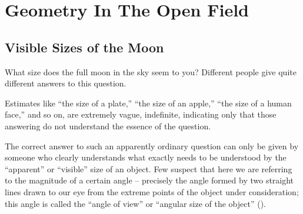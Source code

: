 

\chapter{Geometry In The Open Field}
\label{ch-03}

\section{Visible Sizes of the Moon}
\label{sec-3.1}


What size does the full moon in the sky seem to you? Different people give quite different answers to this question.

Estimates like ``the size of a plate,'' ``the size of an apple,'' ``the size of a human face,'' and so on, are extremely vague, indefinite, indicating only that those answering do not understand the essence of the question.

The correct answer to such an apparently ordinary question can only be given by someone who clearly understands what exactly needs to be understood by the ``apparent'' or ``visible'' size of an object. Few suspect that here we are referring to the magnitude of a certain angle -- precisely the angle formed by two straight lines drawn to our eye from the extreme points of the object under consideration; this angle is called the ``angle of view'' or ``angular size of the object'' (). 

